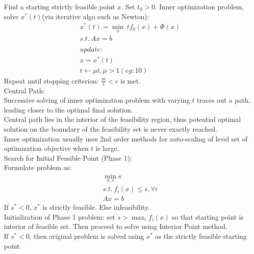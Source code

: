 \documentclass[8pt]{report}
\begin{document}
\begin{multicols*}{2}
  Find a starting strictly feasible point $x$. Set $t_0>0$.
  Inner optimization problem, solve $x^*(t)$(via iterative algo such as Newton):
  \begin{align*}
    &x^*(t) = \min_x\ t f_0(x) + \Phi(x)\\
    &s.t.\ Ax = b\\
    \\
    &update:\\
    &x=x^*(t)\\
    &t\leftarrow \mu t, \mu > 1 (eg: 10)
  \end{align*}
  Repeat until stopping criterion: $\frac{m}{t} < \epsilon$ is met.\\

  Central Path:\\
  Successive solving of inner optimization problem with varying $t$ traces out a path, leading closer to the optimal final solution.\\

  Central path lies in the interior of the feasibility region, thus potential optimal solution on the boundary of the feasibility set is never exactly reached.\\

  Inner optimization usually uses 2nd order methods for auto-scaling of level set of optimization objective when $t$ is large.\\

  \vfill\null
  \pagebreak
  Search for Initial Feasible Point (Phase 1):\\
  Formulate problem as:\\
  \begin{align*}
    &\min_{x,s} s\\
    &s.t.\ f_i(x) \leq s, \forall i\\
    &Ax=b
  \end{align*}
  If $s^* < 0$, $x^*$ is strictly feasible. Else infeasibility.\\
  
  Initialization of Phase 1 problem: set $s > \max_i f_i(x)$ so that starting point is interior of feasible set. Then proceed to solve using Interior Point method.\\

  If $s^* < 0$, then original problem is solved using $x^*$ as the strictly feasible starting point.


\end{multicols*}
\end{document}
